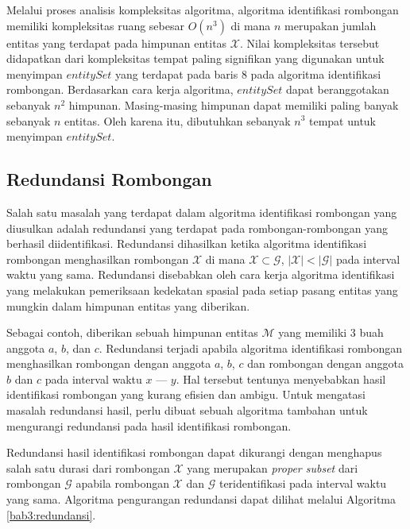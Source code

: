 Melalui proses analisis kompleksitas algoritma, algoritma identifikasi rombongan memiliki kompleksitas ruang sebesar $O(n^3)$ di mana $n$ merupakan jumlah entitas yang terdapat pada himpunan entitas $\mathcal{X}$. Nilai kompleksitas tersebut didapatkan dari kompleksitas tempat paling signifikan yang digunakan untuk menyimpan $entitySet$ yang terdapat pada baris $8$ pada algoritma identifikasi rombongan. Berdasarkan cara kerja algoritma, $entitySet$ dapat beranggotakan sebanyak $n^2$ himpunan. Masing-masing himpunan dapat memiliki paling banyak sebanyak $n$ entitas. Oleh karena itu, dibutuhkan sebanyak $n^3$ tempat untuk menyimpan $entitySet$.

\subsection{Redundansi Rombongan}
\label{sec:redundancy}

Salah satu masalah yang terdapat dalam algoritma identifikasi rombongan yang diusulkan adalah redundansi yang terdapat pada rombongan-rombongan yang berhasil diidentifikasi. Redundansi dihasilkan ketika algoritma identifikasi rombongan menghasilkan rombongan $\mathcal{X}$ di mana $\mathcal{X} \subset \mathcal{G}$, $|\mathcal{X}| < |\mathcal{G}|$ pada interval waktu yang sama. Redundansi disebabkan oleh cara kerja algoritma identifikasi yang melakukan pemeriksaan kedekatan spasial pada setiap pasang entitas yang mungkin dalam himpunan entitas yang diberikan.

Sebagai contoh, diberikan sebuah himpunan entitas $\mathcal{M}$ yang memiliki 3 buah anggota $a$, $b$, dan $c$. Redundansi terjadi apabila algoritma identifikasi rombongan menghasilkan rombongan dengan anggota $a$, $b$, $c$ dan rombongan dengan anggota $b$ dan $c$ pada interval waktu $x$ --- $y$. Hal tersebut tentunya menyebabkan hasil identifikasi rombongan yang kurang efisien dan ambigu. Untuk mengatasi masalah redundansi hasil, perlu dibuat sebuah algoritma tambahan untuk mengurangi redundansi pada hasil identifikasi rombongan.

Redundansi hasil identifikasi rombongan dapat dikurangi dengan menghapus salah satu durasi dari rombongan $\mathcal{X}$ yang merupakan \textit{proper subset} dari rombongan $\mathcal{G}$ apabila rombongan $\mathcal{X}$ dan $\mathcal{G}$ teridentifikasi pada interval waktu yang sama. Algoritma pengurangan redundansi dapat dilihat melalui Algoritma \ref{bab3:redundansi}.

